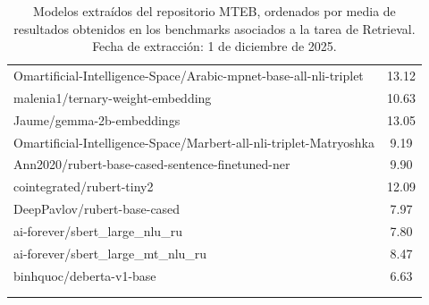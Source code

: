 \begin{xltabular}{\textwidth}{X c}
    Omartificial-Intelligence-Space/Arabic-mpnet-base-all-nli-triplet    & 13.12                    \\
    malenia1/ternary-weight-embedding                                    & 10.63                    \\
    Jaume/gemma-2b-embeddings                                            & 13.05                    \\
    Omartificial-Intelligence-Space/Marbert-all-nli-triplet-Matryoshka   & 9.19                     \\
    Ann2020/rubert-base-cased-sentence-finetuned-ner                     & 9.90                     \\
    cointegrated/rubert-tiny2                                            & 12.09                    \\
    DeepPavlov/rubert-base-cased                                         & 7.97                     \\
    ai-forever/sbert\_large\_nlu\_ru                                     & 7.80                     \\
    ai-forever/sbert\_large\_mt\_nlu\_ru                                 & 8.47                     \\
    binhquoc/deberta-v1-base                                             & 6.63                     \\
    \hline
    \label{tab:resultados_completos_modelos_mteb_retrieval} \\
    \caption{Modelos extraídos del repositorio MTEB, ordenados por media de resultados obtenidos en los benchmarks asociados a la tarea de Retrieval. Fecha de extracción: 1 de diciembre de 2025.}
\end{xltabular}



